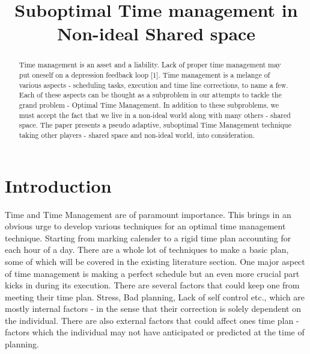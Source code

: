 \documentclass[conference]{IEEEtran}
\begin{document}
%
\title{Suboptimal Time management in Non-ideal Shared space}


\author{
}

\maketitle


\begin{abstract}
Time management is an asset and a liability. Lack of proper time management may put oneself on a depression feedback loop [1]. Time management is a melange of various aspects - scheduling tasks, execution and time line corrections, to name a few. Each of these aspects can be thought as a subproblem in our attempts to tackle the grand problem - Optimal Time Management. In addition to these subproblems, we must accept the fact that we live in a non-ideal world along with many others - shared space.  The paper presents a pseudo adaptive, suboptimal Time Management technique taking other players - shared space and non-ideal world, into consideration.
\end{abstract}


%
\IEEEpeerreviewmaketitle


\section{Introduction}
Time and Time Management are of paramount importance. This brings in an obvious urge to develop various techniques for an optimal time management technique. Starting from marking calender to a rigid time plan accounting for each hour of a day. There are a whole lot of techniques to make a basic plan, some of which will be covered in the existing literature section. One major aspect of time management is making a perfect schedule but an even more crucial part kicks in during its execution. There are several factors that could keep one from meeting their time plan. Stress, Bad planning, Lack of self control etc., which are mostly internal factors - in the sense that their correction is solely dependent on the individual. There are also external factors that could affect ones time plan - factors which the individual may not have anticipated or predicted at the time of planning.
\end{document}
